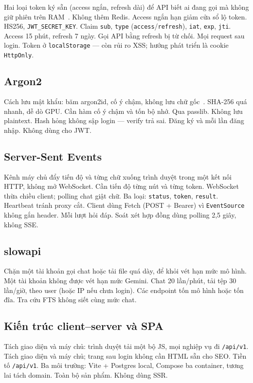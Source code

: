 \boncau
{Hai loại token ký sẵn (access ngắn, refresh dài) để API biết ai đang gọi mà
không giữ phiên trên RAM~\cite{rfc7519}.}
{Không thêm Redis. Access ngắn hạn giảm cửa sổ lộ token.}
{HS256, \texttt{JWT\_SECRET\_KEY}. Claim \texttt{sub}, \texttt{type}
(\texttt{access}/\texttt{refresh}), \texttt{iat}, \texttt{exp}, \texttt{jti}.
Access 15 phút, refresh 7 ngày. Gọi API bằng refresh bị từ chối.}
{Mọi request sau login. Token ở \texttt{localStorage} --- còn rủi ro XSS; hướng
phát triển là cookie \texttt{HttpOnly}.}

\subsection{Argon2}

\boncau
{Cách lưu mật khẩu: băm argon2id, cố ý chậm, không lưu chữ gốc~\cite{argon2}.}
{SHA-256 quá nhanh, dễ dò GPU. Cần hàm cố ý chậm và tốn bộ nhớ.}
{Qua passlib. Không lưu plaintext. Hash hỏng không sập login --- verify trả sai.}
{Đăng ký và mỗi lần đăng nhập. Không dùng cho JWT.}

\subsection{Server-Sent Events}

\boncau
{Kênh máy chủ đẩy tiến độ và từng chữ xuống trình duyệt trong một kết nối HTTP,
không mở WebSocket.}
{Cần tiến độ từng nút và từng token. WebSocket thừa chiều client; polling chat
giật chữ.}
{Ba loại: \texttt{status}, \texttt{token}, \texttt{result}. Heartbeat tránh
proxy cắt. Client dùng Fetch (POST + Bearer) vì \texttt{EventSource} không gắn
header.}
{Mỗi lượt hỏi đáp. Soát xét hợp đồng dùng polling 2,5 giây, không SSE.}

\subsection{slowapi}

\boncau
{Chặn một tài khoản gọi chat hoặc tải file quá dày, để khỏi vét hạn mức mô hình.}
{Một tài khoản không được vét hạn mức Gemini.}
{Chat 20 lần/phút, tải tệp 30 lần/giờ, theo user (hoặc IP nếu chưa login).}
{Các endpoint tốn mô hình hoặc tốn đĩa. Tra cứu FTS không siết cùng mức chat.}

\subsection{Kiến trúc client--server và SPA}

\boncau
{Tách giao diện và máy chủ: trình duyệt tải một bộ JS, mọi nghiệp vụ đi
\texttt{/api/v1}.}
{Tách giao diện và máy chủ; trang sau login không cần HTML sẵn cho SEO.}
{Tiền tố \texttt{/api/v1}. Ba môi trường: Vite + Postgres local, Compose ba
container, tương lai tách domain.}
{Toàn bộ sản phẩm. Không dùng SSR.}
